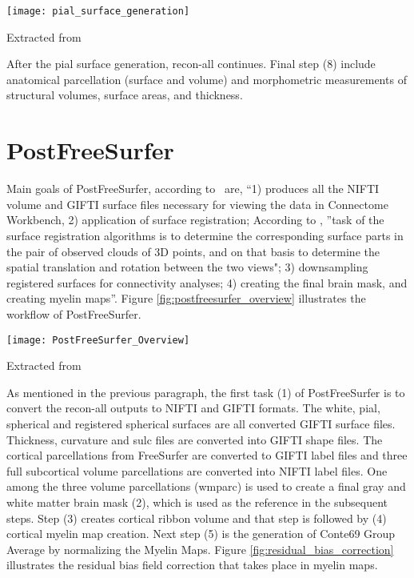 \begin{center}
  \texttt{[image: pial\_surface\_generation]}
  \label{fig:pial_surface_generation}
  \caption*{Extracted from \cite{Gla13}}
\end{center}

After the pial surface generation, recon-all continues. Final step (8) include anatomical parcellation (surface and volume) and morphometric measurements of structural volumes, surface areas, and thickness.

\section{PostFreeSurfer} \label{sec:PostFreeSurfer}
Main goals of PostFreeSurfer, according to~\cite{Gla13} are, ``1) produces all the NIFTI volume and GIFTI surface files necessary for viewing the data in Connectome Workbench, 2) application of surface registration; According to \cite{DBLP:journals/corr/HrgeticP13}, ''task of the surface registration algorithms is to determine the corresponding surface parts in the pair of observed clouds of 3D points, and on that basis to determine the spatial translation and rotation between the two views"; 3) downsampling registered surfaces for connectivity analyses; 4) creating the final brain mask, and creating myelin maps''. Figure \ref{fig:postfreesurfer_overview} illustrates the workflow of PostFreeSurfer.\\

\begin{center}
  \texttt{[image: PostFreeSurfer\_Overview]}
  \label{fig:postfreesurfer_overview}
  \caption*{Extracted from \cite{Gla13}}
\end{center}

As mentioned in the previous paragraph, the first task (1) of PostFreeSurfer is to convert the recon-all outputs to NIFTI and GIFTI formats. The white, pial, spherical and registered spherical surfaces are all converted GIFTI surface files. Thickness, curvature and sulc files are converted into GIFTI shape files. The cortical parcellations from FreeSurfer are converted to GIFTI label files and three full subcortical volume parcellations are converted into NIFTI label files. One among the three volume parcellations (wmparc) is used to create a final gray and white matter brain mask (2), which is used as the reference in the subsequent steps. Step (3) creates cortical ribbon volume and that step is followed by (4) cortical myelin map creation. Next step (5) is the generation of Conte69 Group Average by normalizing the Myelin Maps. Figure \ref{fig:residual_bias_correction} illustrates the residual bias field correction that takes place in myelin maps.

